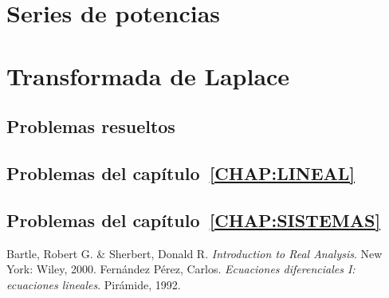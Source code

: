 \documentclass[a4paper, 10pt, openany]{book}
\begin{document}
\chapter{Series de potencias}
\label{CHAP:SERIES}


\chapter{Transformada de Laplace}
\label{CHAP:LAPLACE}


\begin{appendices}

\chapter{Problemas resueltos}

\section{Problemas del capítulo~\ref{CHAP:LINEAL}}


\section{Problemas del capítulo~\ref{CHAP:SISTEMAS}}


\end{appendices}

\backmatter

\listoffigures

\listoftables

\begin{thebibliography}{9}
		Bartle, Robert G. \& Sherbert, Donald R.
		\textit{Introduction to Real Analysis}. 
		New York: Wiley, 2000. 
        Fernández Pérez, Carlos.
        \textit{Ecuaciones diferenciales I: ecuaciones lineales}.
        Pirámide, 1992.
\end{thebibliography}
\end{document}

